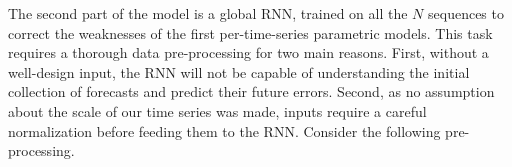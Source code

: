 \documentclass{article} %
\newcommand{\ts}{y}
\newcommand{\fullts}{{\bf \ts}}
\newcommand{\tspred}{\hat{\ts}}
\newcommand{\stat}{f}
\newcommand{\statparam}{\theta_{predictor}}
\newcommand{\lag}{h}
\newcommand{\predictor}{\mathrm{RNN}_p}
\newcommand{\classifier}{\mathrm{RNN}_c}
\newcommand{\remainder}{r}
\newcommand{\hiddenregime}{U}
\begin{document}
The second part of the model is a global RNN, trained on all the $N$ sequences to correct the weaknesses of the first per-time-series parametric models. This task requires a thorough data pre-processing for two main reasons. First, without a well-design input, the RNN will not be capable of understanding the initial collection of forecasts and predict their future errors. Second, as no assumption about the scale of our time series was made, inputs require a careful normalization before feeding them to the RNN.
Consider the following pre-processing. 


\end{document}
